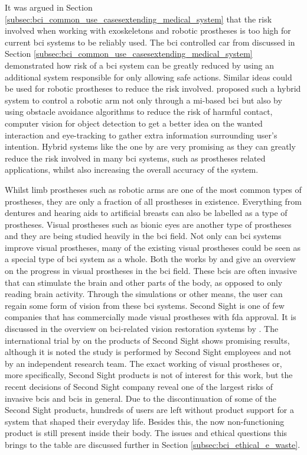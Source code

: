 It was argued in Section \ref{subsec:bci_common_use_casesextending_medical_system} that the risk involved when working with exoskeletons and robotic prostheses is too high for current \gls{bci} systems to be reliably used.
The \gls{bci} controlled car from \citet{bci_mi_four_wheel_drive} discussed in Section \ref{subsec:bci_common_use_casesextending_medical_system} demonstrated how risk of a \gls{bci} system can be greatly reduced by using an additional system responsible for only allowing safe actions.
Similar ideas could be used for robotic prostheses to reduce the risk involved.
 proposed such a hybrid system to control a robotic arm not only through a \gls{mi}-based \gls{bci} but also by using obstacle avoidance algorithms to reduce the risk of harmful contact, computer vision for object detection to get a better idea on the wanted interaction and eye-tracking to gather extra information surrounding user's intention.
Hybrid systems like the one by \citet{bci_mi_robotic_arm_collision_avoidance} are very promising as they can greatly reduce the risk involved in many \gls{bci} systems, such as prostheses related applications, whilst also increasing the overall accuracy of the system.

Whilst limb prostheses such as robotic arms are one of the most common types of prostheses, they are only a fraction of all prostheses in existence.
Everything from dentures and hearing aids to artificial breasts can also be labelled as a type of prostheses.
Visual prostheses such as bionic eyes are another type of prostheses and they are being studied heavily in the \gls{bci} field.
Not only can \gls{bci} systems improve visual prostheses, many of the existing visual prostheses could be seen as a special type of \gls{bci} system as a whole.
Both the works by \citet{bci_blind_assist_review} and \citet{bci_vision_assist_review} give an overview on the progress in visual prostheses in the \gls{bci} field.
These \glspl{bci} are often invasive that can stimulate the brain and other parts of the body, as opposed to only reading brain activity.
Through the simulations or other means, the user can regain some form of vision from these \gls{bci} systems.
Second Sight is one of few companies that has commercially made visual prostheses with \gls{fda} approval.
It is discussed in the overview on \gls{bci}-related vision restoration systems by \citet{bci_vision_assist_review}.
The international trial by \citet{second_sight_trial} on the products of Second Sight shows promising results, although it is noted the study is performed by Second Sight employees and not by an independent research team.
The exact working of visual prostheses or, more specifically, Second Sight products is not of interest for this work, but the recent decisions of Second Sight company reveal one of the largest risks of invasive \glspl{bci} and \glspl{bci} in general.
Due to the discontinuation of some of the Second Sight products, hundreds of users are left without product support for a system that shaped their everyday life.
Besides this, the now non-functioning product is still present inside their body.
The issues and ethical questions this brings to the table are discussed further in Section \ref{subsec:bci_ethical_e_waste}.

